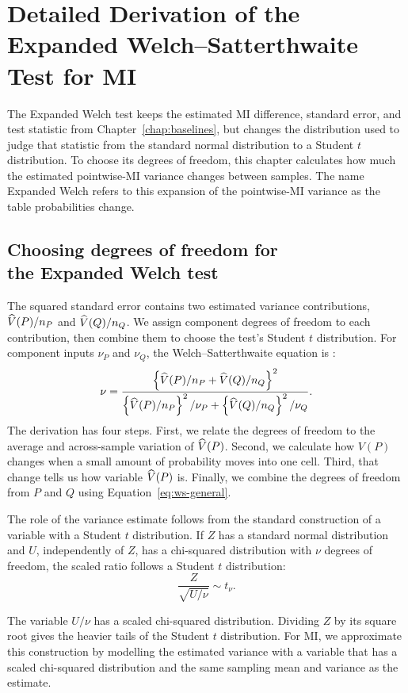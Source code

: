 \chapter{Detailed Derivation of the Expanded Welch--Satterthwaite Test for MI}
\label{chap:expanded}

The Expanded Welch test keeps the estimated MI difference, standard error, and test
statistic from Chapter~\ref{chap:baselines}, but changes the distribution used
to judge that statistic from the standard normal distribution to a Student
\(t\) distribution. To choose its degrees of freedom, this chapter calculates
how much the estimated pointwise-MI variance changes between samples. The name
Expanded Welch refers to this expansion of the pointwise-MI variance as the table
probabilities change.

\section[Choosing degrees of freedom for the Expanded Welch test]{Choosing degrees of
freedom for\\the Expanded Welch test}
\label{sec:component-df-choice}

The squared standard error contains two estimated variance contributions,
\(\widehat V(P)/n_P\) and \(\widehat V(Q)/n_Q\). We assign component degrees of
freedom to each contribution, then combine them to choose the test's
Student \(t\) distribution. For component inputs \(\nu_P\) and
\(\nu_Q\), the Welch--Satterthwaite equation is
\citep{satterthwaite1946,welch1947}:
\begin{equation}
  \nu
  =
  \frac{
  \left\{\widehat V(P)/n_P+\widehat V(Q)/n_Q\right\}^2
  }{
  \left\{\widehat V(P)/n_P\right\}^2/\nu_P
  +\left\{\widehat V(Q)/n_Q\right\}^2/\nu_Q
  }.
  \label{eq:ws-general}
\end{equation}
The derivation has four steps. First, we relate the degrees of freedom to the
average and across-sample variation of \(\widehat V(P)\). Second, we calculate how \(V(P)\)
changes when a small amount of probability moves into one cell. Third, that
change tells us how variable \(\widehat V(P)\) is. Finally, we combine the
degrees of freedom from \(P\) and \(Q\) using Equation~\eqref{eq:ws-general}.

\begin{samepage}
\medskip
The role of the variance estimate follows from the standard construction
of a variable with a Student \(t\) distribution. If \(Z\) has a standard normal distribution
and \(U\), independently of \(Z\), has a chi-squared distribution with \(\nu\)
degrees of freedom, the scaled ratio follows a Student \(t\) distribution:
\begin{equation}
 \frac{Z}{\sqrt{U/\nu}}\sim t_\nu.
 \label{eq:t-reference-construction}
\end{equation}
\par
\end{samepage}
The variable \(U/\nu\) has a scaled chi-squared distribution.
Dividing \(Z\) by its square root gives the heavier tails of the Student
\(t\) distribution. For MI, we approximate this construction by modelling
the estimated variance with a variable that has a scaled chi-squared
distribution and the same sampling mean and variance as the estimate.

